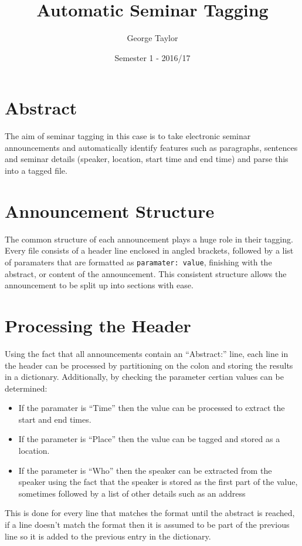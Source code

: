 \documentclass[draft]{article}
\title{Automatic Seminar Tagging}
\author{George Taylor}
\date{Semester 1 - 2016/17}
\begin{document}
\nocite{*}


\maketitle
\begin{multicols*}{2}

\section*{Abstract}
The aim of seminar tagging in this case is to take electronic seminar announcements and automatically identify features such as paragraphs, sentences and seminar details (speaker, location, start time and end time) and parse this into a tagged file.

\section*{Announcement Structure}
The common structure of each announcement plays a huge role in their tagging. Every file consists of a header line enclosed in angled brackets, followed by a list of paramaters that are formatted as \texttt{paramater: value}, finishing with the abstract, or content of the announcement. This consistent structure allows the announcement to be split up into sections with ease.

\section*{Processing the Header}
Using the fact that all announcements contain an ``Abstract:'' line, each line in the header can be processed by partitioning on the colon and storing the results in a dictionary. Additionally, by checking the parameter certian values can be determined:
\begin{itemize}
\item If the paramater is ``Time'' then the value can be processed to extract the start and end times.
\item If the parameter is ``Place'' then the value can be tagged and stored as a location.
\item If the parameter is ``Who'' then the speaker can be extracted from the speaker using the fact that the speaker is stored as the first part of the value, sometimes followed by a list of other details such as an address
\end{itemize}
This is done for every line that matches the format until the abstract is reached, if a line doesn't match the format then it is assumed to be part of the previous line so it is added to the previous entry in the dictionary.


\end{multicols*}
\end{document}
